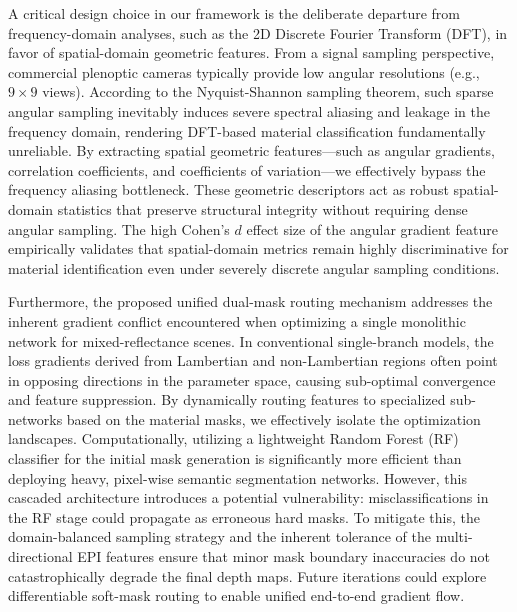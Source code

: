 \documentclass[lettersize,journal]{IEEEtran}
\begin{document}
A critical design choice in our framework is the deliberate departure from frequency-domain analyses, such as the 2D Discrete Fourier Transform (DFT), in favor of spatial-domain geometric features. From a signal sampling perspective, commercial plenoptic cameras typically provide low angular resolutions (e.g., $9 \times 9$ views). According to the Nyquist-Shannon sampling theorem, such sparse angular sampling inevitably induces severe spectral aliasing and leakage in the frequency domain, rendering DFT-based material classification fundamentally unreliable. By extracting spatial geometric features---such as angular gradients, correlation coefficients, and coefficients of variation---we effectively bypass the frequency aliasing bottleneck. These geometric descriptors act as robust spatial-domain statistics that preserve structural integrity without requiring dense angular sampling. The high Cohen's $d$ effect size of the angular gradient feature empirically validates that spatial-domain metrics remain highly discriminative for material identification even under severely discrete angular sampling conditions.

Furthermore, the proposed unified dual-mask routing mechanism addresses the inherent gradient conflict encountered when optimizing a single monolithic network for mixed-reflectance scenes. In conventional single-branch models, the loss gradients derived from Lambertian and non-Lambertian regions often point in opposing directions in the parameter space, causing sub-optimal convergence and feature suppression. By dynamically routing features to specialized sub-networks based on the material masks, we effectively isolate the optimization landscapes. Computationally, utilizing a lightweight Random Forest (RF) classifier for the initial mask generation is significantly more efficient than deploying heavy, pixel-wise semantic segmentation networks. However, this cascaded architecture introduces a potential vulnerability: misclassifications in the RF stage could propagate as erroneous hard masks. To mitigate this, the domain-balanced sampling strategy and the inherent tolerance of the multi-directional EPI features ensure that minor mask boundary inaccuracies do not catastrophically degrade the final depth maps. Future iterations could explore differentiable soft-mask routing to enable unified end-to-end gradient flow.
\end{document}
